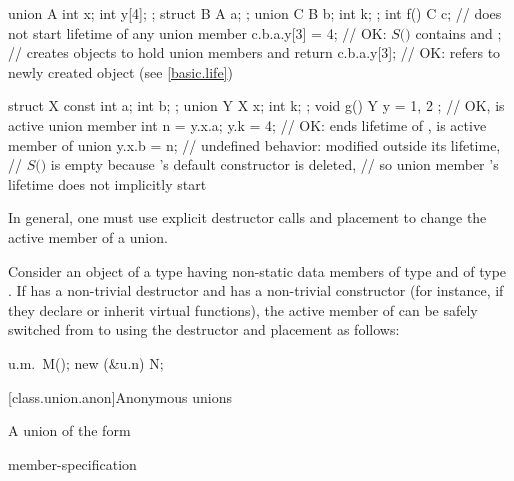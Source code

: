 \begin{example}
\begin{codeblock}
union A { int x; int y[4]; };
struct B { A a; };
union C { B b; int k; };
int f() {
  C c;                  // does not start lifetime of any union member
  c.b.a.y[3] = 4;       // OK: $S($$)$ contains  and ;
                        // creates objects to hold union members  and 
  return c.b.a.y[3];    // OK:  refers to newly created object (see \ref{basic.life})
}

struct X { const int a; int b; };
union Y { X x; int k; };
void g() {
  Y y = { { 1, 2 } };   // OK,  is active union member
  int n = y.x.a;
  y.k = 4;              // OK: ends lifetime of ,  is active member of union
  y.x.b = n;            // undefined behavior:  modified outside its lifetime,
                        // $S($$)$ is empty because 's default constructor is deleted,
                        // so union member 's lifetime does not implicitly start
}
\end{codeblock}
\end{example}

\pnum
\begin{note} In general, one must use explicit destructor calls and placement
 to change the active member of a union. \end{note}
\begin{example}
Consider an object  of a  type  having non-static data members
 of type  and  of type . If  has a non-trivial
destructor and  has a non-trivial constructor (for instance, if they declare or inherit
virtual functions), the active member of  can be safely switched from  to
 using the destructor and placement  as follows:

\begin{codeblock}
u.m.~M();
new (&u.n) N;
\end{codeblock}
\end{example}

[class.union.anon]{Anonymous unions}
%

\pnum
A union of the form

\begin{ncsimplebnf}
 \terminal{\{} member-specification \terminal{\}} \terminal{;}
\end{ncsimplebnf}

